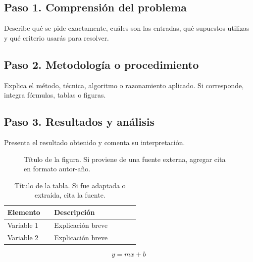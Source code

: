 \documentclass[10pt,letterpaper]{article}
\begin{document}
\subsection*{Paso 1. Comprensión del problema}
Describe qué se pide exactamente, cuáles son las entradas, qué supuestos utilizas y qué criterio usarás para resolver.

\subsection*{Paso 2. Metodología o procedimiento}
Explica el método, técnica, algoritmo o razonamiento aplicado. Si corresponde, integra fórmulas, tablas o figuras.

\subsection*{Paso 3. Resultados y análisis}
Presenta el resultado obtenido y comenta su interpretación.

\begin{figure}[h]
    \centering
    \caption{Título de la figura. Si proviene de una fuente externa, agregar cita en formato autor-año.}
\end{figure}

\begin{table}[h]
    \centering
    \begin{tabular}{>{\raggedright\arraybackslash}p{0.30\linewidth} >{\raggedright\arraybackslash}p{0.55\linewidth}}
        \toprule
        Elemento & Descripción \\
        \midrule
        Variable 1 & Explicación breve \\
        Variable 2 & Explicación breve \\
        \bottomrule
    \end{tabular}
    \caption{Título de la tabla. Si fue adaptada o extraída, cita la fuente.}
\end{table}

\begin{equation}
    y = mx + b
\end{equation}
\end{document}
